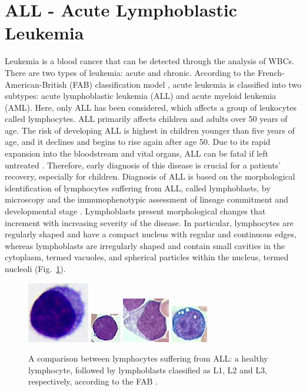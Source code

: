 \section{ALL - Acute Lymphoblastic Leukemia}
Leukemia is a blood cancer that can be detected through the analysis of WBCs. There are two types of leukemia: acute and chronic. According to the French-American-British (FAB) classification model \cite{Bennett}, acute leukemia is classified into two subtypes: acute lymphoblastic leukemia (\acs{ALL}) and acute myeloid leukemia (AML). Here, only ALL has been considered, which affects a group of leukocytes called lymphocytes. ALL primarily affects children and adults over 50 years of age. The risk of developing ALL is highest in children younger than five years of age, and it declines and begins to rise again after age 50. Due to its rapid expansion into the bloodstream and vital organs, ALL can be fatal if left untreated \cite{Biondi}. Therefore, early diagnosis of this disease is crucial for a patients' recovery, especially for children. Diagnosis of ALL is based on the morphological identification of lymphocytes suffering from ALL, called lymphoblasts, by microscopy and the immunophenotypic assessment of lineage commitment and developmental stage \cite{Inaba}. Lymphoblasts present morphological changes that increment with increasing severity of the disease. In particular, lymphocytes are regularly shaped and have a compact nucleus with regular and continuous edges, whereas lymphoblasts are irregularly shaped and contain small cavities in the cytoplasm, termed vacuoles, and spherical particles within the nucleus, termed nucleoli \cite{Donida} (Fig.~\ref{fig:ex2}).

\begin{figure}[!t]
	\centering
	\includegraphics[height=0.125\textheight]{images/crop-BlastNo}
	\includegraphics[height=0.125\textheight]{images/crop-BlastL1}
	\includegraphics[height=0.125\textheight]{images/crop-BlastL2}
	\includegraphics[height=0.125\textheight]{images/crop-BlastL3}
	\caption[Lymphocytes suffering from ALL comparison.]{\label{fig:ex2}A comparison between lymphocytes suffering from ALL: a healthy lymphocyte, followed by lymphoblasts classified as L1, L2 and L3, respectively, according to the FAB \cite{Bennett}.}
\end{figure}

